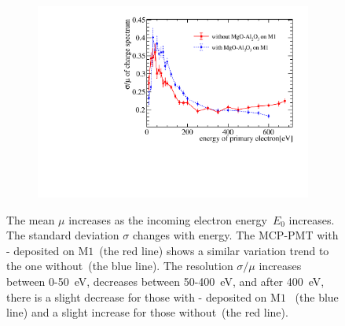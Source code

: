 \begin{figure}[!ht]
\begin{subfigure}[b]{0.45\textwidth}
		\includegraphics[width=\textwidth]{PMTRelated/GTmodel/gain_sigmamu.pdf}
		\caption{}
		\label{fig:sigmamu}
	\end{subfigure}
	\caption{ The mean \(\mu\) increases as the incoming electron energy~$E_0$ increases.
		 The standard deviation \(\sigma\) changes with energy.
		The MCP-PMT with - deposited on $\mathrm{M}1$~(the red line) shows a similar variation trend to the one without~(the blue line).
		 The resolution $\sigma/\mu$ increases between 0-\SI{50}{eV}, decreases between 50-\SI{400}{eV},
		and after \SI{400}{eV}, there is a slight decrease for those with - deposited on $\mathrm{M}1$ ~(the blue line) and a slight increase for those without~(the red line).
	}
	\label{fig:gaintest}
\end{figure}

